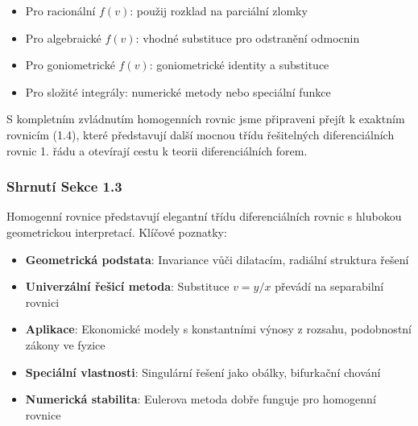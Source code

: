 \vspace{0.6\baselineskip}

\begin{remark}
\begin{itemize}
\item Pro racionální $f(v)$: použij rozklad na parciální zlomky
\item Pro algebraické $f(v)$: vhodné substituce pro odstranění odmocnin
\item Pro goniometrické $f(v)$: goniometrické identity a substituce
\item Pro složité integrály: numerické metody nebo speciální funkce
\end{itemize}
\end{remark}

\vspace{0.8\baselineskip}

\begin{transition}
S kompletním zvládnutím homogenních rovnic jsme připraveni přejít k exaktním rovnicím (1.4), které představují další mocnou třídu řešitelných diferenciálních rovnic 1. řádu a otevírají cestu k teorii diferenciálních forem.
\end{transition}

\vspace{0.8\baselineskip}

\subsubsection*{Shrnutí Sekce 1.3}

Homogenní rovnice představují elegantní třídu diferenciálních rovnic s hlubokou geometrickou interpretací. Klíčové poznatky:

\begin{itemize}
\item \textbf{Geometrická podstata}: Invariance vůči dilatacím, radiální struktura řešení
\item \textbf{Univerzální řešicí metoda}: Substituce $v = y/x$ převádí na separabilní rovnici
\item \textbf{Aplikace}: Ekonomické modely s konstantními výnosy z rozsahu, podobnostní zákony ve fyzice
\item \textbf{Speciální vlastnosti}: Singulární řešení jako obálky, bifurkační chování
\item \textbf{Numerická stabilita}: Eulerova metoda dobře funguje pro homogenní rovnice
\end{itemize}

